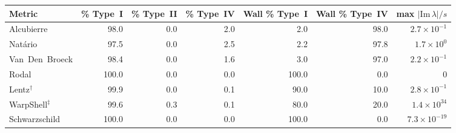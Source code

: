 \begin{tabular}{@{}l r r r r r r@{}}
    \toprule
    Metric & \% Type~I & \% Type~II & \% Type~IV & Wall \% Type~I & Wall \% Type~IV & max $|\mathrm{Im}\,\lambda|/s$ \\
    \midrule
    Alcubierre & 98.0 & 0.0 & 2.0 & 2.0 & 98.0 & $2.7\times10^{-1}$ \\
    Nat\'ario & 97.5 & 0.0 & 2.5 & 2.2 & 97.8 & $1.7\times10^{0}$ \\
    Van~Den~Broeck & 98.4 & 0.0 & 1.6 & 3.0 & 97.0 & $2.2\times10^{-1}$ \\
    Rodal & 100.0 & 0.0 & 0.0 & 100.0 & 0.0 & $0$ \\
    \midrule
    Lentz$^{\dagger}$ & 99.9 & 0.0 & 0.1 & 90.0 & 10.0 & $2.8\times10^{-1}$ \\
    \midrule
    WarpShell$^{\ddagger}$ & 99.6 & 0.3 & 0.1 & 80.0 & 20.0 & $1.4\times10^{34}$ \\
    \midrule
    Schwarzschild & 100.0 & 0.0 & 0.0 & 100.0 & 0.0 & $7.3\times10^{-19}$ \\
    \bottomrule
\end{tabular}
